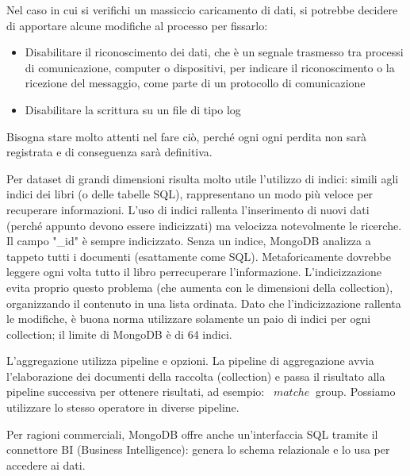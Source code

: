 \documentclass[a4page, 11pt]{article}
\begin{document}
Nel caso in cui si verifichi un massiccio caricamento di dati, si potrebbe decidere di apportare alcune modifiche al processo per fissarlo:
\begin{itemize}[noitemsep]
\item Disabilitare il riconoscimento dei dati, che è un segnale trasmesso tra processi di comunicazione, computer o dispositivi, per indicare il riconoscimento o la ricezione del messaggio, come parte di un protocollo di comunicazione
\item Disabilitare la scrittura su un file di tipo log
\end{itemize}
Bisogna stare molto attenti nel fare ciò, perché ogni ogni perdita non sarà registrata e di conseguenza sarà definitiva.
\newline

Per dataset di grandi dimensioni risulta molto utile l'utilizzo di indici: simili agli indici dei libri (o delle tabelle SQL), rappresentano un modo più veloce per recuperare informazioni.
L'uso di indici rallenta l'inserimento di nuovi dati (perché appunto devono essere indicizzati) ma velocizza notevolmente le ricerche. Il campo "\_id" è sempre indicizzato.
Senza un indice, MongoDB analizza a tappeto tutti i documenti (esattamente come SQL). Metaforicamente dovrebbe leggere ogni volta tutto il libro perrecuperare l'informazione.
L'indicizzazione evita proprio questo problema (che aumenta con le dimensioni della collection), organizzando il contenuto in una lista ordinata.
Dato che l'indicizzazione rallenta le modifiche, è buona norma utilizzare solamente un paio di indici per ogni collection; il limite di MongoDB è di 64 indici.

L'aggregazione utilizza pipeline e opzioni.
La pipeline di aggregazione avvia l'elaborazione dei documenti della raccolta (collection) e passa il risultato alla pipeline successiva per ottenere risultati, ad esempio: \ $ match e \ $ group.
Possiamo utilizzare lo stesso operatore in diverse pipeline.

Per ragioni commerciali, MongoDB offre anche un'interfaccia SQL tramite il connettore BI (Business Intelligence): genera lo schema relazionale e lo usa per accedere ai dati.
\end{document}
